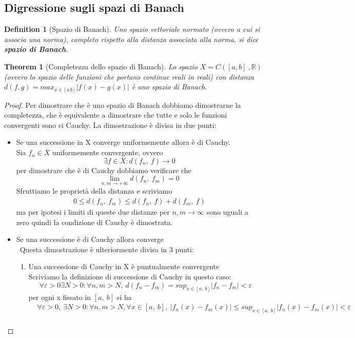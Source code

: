 \documentclass[10pt,a4paper]{article}
\newtheorem{theorem}{Theorem}
\newtheorem{proof}{Proof}
\newtheorem{definition}{Definition}
\begin{document}
\subsection{Digressione sugli spazi di Banach}
\begin{definition}[Spazio di Banach]
Uno spazio vettoriale normato (ovvero a cui si associa una norma), completo rispetto alla distanza associata alla norma, si dice \textbf{spazio di Banach}. 
\end{definition}
\begin{theorem}[Completezza dello spazio di Banach]
	Lo spazio \(X = C([a,b]\ , \mathbb{R})\) (ovvero lo spazio delle funzioni che portano continue reali in reali) con distanza \(d(f, g) = max_{x \in [a\, b]} |f(x)-g(x)|\) è uno spazio di Banach.
\end{theorem}
\begin{proof}
	Per dimostrare che è uno spazio di Banach dobbiamo dimostrarne la completezza, che è equivalente a dimostrare che tutte e solo le funzioni convergenti sono ci Cauchy. 
	La dimostrazione è divisa in due punti:
	\begin{itemize}
		\item Se una successione in X converge uniformemente allora è di Cauchy.\\
		Sia \(f_n\in X\) uniformemente convergente, ovvero
		\[\exists f \in X: d(f_n,\ f)\rightarrow 0\] 
		per dimostrare che è di Cauchy dobbiamo verificare che 
		\[\lim_{n,m\to+\infty}d(f_n,\ f_m)=0\]
		Sfruttiamo le proprietà della distanza e scriviamo
		\begin{align*}
			0\leq d(f_n,\ f_m)\leq d(f_n,\ f)+d(f_m,\ f)
		\end{align*}
		ma per ipotesi i limiti di queste due distanze per \(n,m\rightarrow\infty\) sono uguali a zero quindi la condizione di Cauchy è dimostrata.
		\item Se una successione è di Cauchy allora converge\\\
		Questa dimostrazione è ulteriormente divisa in 3 punti:
		\begin{enumerate}
			\item Una successione di Cauchy in X è puntualmente convergente\\
			Scriviamo la definizione di successione di Cauchy in questo caso:  
			\[\forall \varepsilon > 0 \exists N>0 : \forall n,m >N,\ d(f_n-f_m) = sup_{x\in[a,\ b]}|f_n - f_m| < \varepsilon\] 
			per ogni x fissato in \([a,\ b]\) si ha
			\begin{align*}
			&\forall \varepsilon > 0,\ \exists N>0 : \forall n,m >N,\forall x\in[a,\ b],\ |f_n(x) - f_m(x)| \leq sup_{x\in[a,\ b]}|f_n(x) - f_m(x)|< \varepsilon\\

\end{align*}
\end{enumerate}
\end{itemize}
\end{proof}
\end{document}
